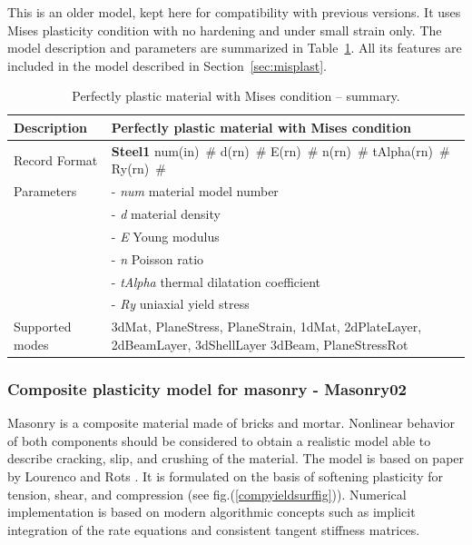 \documentclass[a4paper]{article}
\newcommand{\descitem}[1]{{\noindent \bf #1}}
\newcommand{\elemparam}[2]{{{#1\tiny (#2)}~\#}}
\newcommand{\param}[1]{{\it #1}}
\begin{document}
This is an older model, kept here for compatibility with previous versions.
It uses Mises plasticity condition with no hardening and under small strain only.
The model description and parameters are summarized
in Table~\ref{Steel1_table}. All its features are included in the model
described in Section~\ref{sec:misplast}. 

\begin{table}[!htb]
\begin{tabular}{|l|p{9cm}|}
\hline
Description & Perfectly plastic material with Mises condition\\
\hline
Record Format & \descitem{Steel1} \elemparam{num}{in}
\elemparam{d}{rn} \elemparam{E}{rn} \elemparam{n}{rn}
\elemparam{tAlpha}{rn} \elemparam{Ry}{rn}\\
Parameters &- \param{num} material model number\\
&- \param{d} material density\\
&- \param{E} Young modulus\\
&- \param{n} Poisson ratio\\
&- \param{tAlpha} thermal dilatation coefficient\\
&- \param{Ry} uniaxial yield stress\\
Supported modes& 3dMat, PlaneStress, PlaneStrain, 1dMat,
2dPlateLayer, 2dBeamLayer, 3dShellLayer
3dBeam, PlaneStressRot\\
\hline
\end{tabular}
\caption{Perfectly plastic material  with Mises condition -- summary.}
\label{Steel1_table}
\end{table}


\subsubsection{Composite plasticity model for masonry - Masonry02}
Masonry is a composite material made of bricks and mortar. Nonlinear behavior of both components should be considered to obtain a realistic model able to describe cracking, slip, and crushing of the material. The model is based on paper by Lourenco and Rots \cite{Rots}. It is formulated on the basis of softening plasticity for tension, shear, and compression (see fig.(\ref{compyieldsurffig})). Numerical implementation is based on modern algorithmic concepts such as implicit integration of the rate equations and consistent tangent stiffness matrices.
\end{document}
